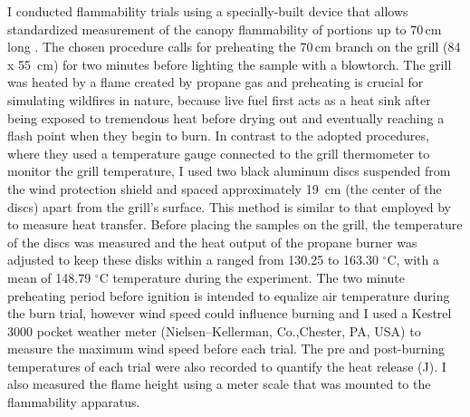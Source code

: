 \documentclass[12pt]{report}
\begin{document}
I conducted flammability trials using a specially-built device that allows standardized measurement of the canopy flammability of portions up to 70\,cm long \citep{jaureguiberry2011device}. The chosen procedure calls for preheating the 70\,cm branch on the grill (84 x 55 \,cm) for two minutes before lighting the sample with a blowtorch. The grill was heated by a flame created by propane gas and preheating is crucial for simulating wildfires in nature, because live fuel first acts as a heat sink after being exposed to tremendous heat before drying out and eventually reaching a flash point when they begin to burn. In contrast to the adopted procedures, where they used a temperature gauge connected to the grill thermometer to monitor the grill temperature, I used two black aluminum discs  suspended from the wind protection shield and spaced approximately 19 \,cm (the center of the discs) apart from the grill's surface. This method is similar to that employed by \citet{gao2022burn} to measure heat transfer. Before placing the samples on the grill, the temperature of the discs was measured and the heat output of the propane burner was adjusted to keep these disks within a ranged from 130.25 to 163.30 $^{\circ}$C, with a mean of 148.79 $^{\circ}$C temperature  during the experiment. The two minute preheating period before ignition is intended to equalize air temperature during the burn trial, however wind speed could influence burning and I used
a Kestrel 3000 pocket weather meter (Nielsen–Kellerman, Co.,Chester, PA, USA) to
measure the maximum wind speed before each trial. 
The pre and post-burning temperatures of each trial were also recorded to quantify the heat release (J). I also measured the flame height using a meter scale that was mounted to the flammability apparatus.

\end{document}
